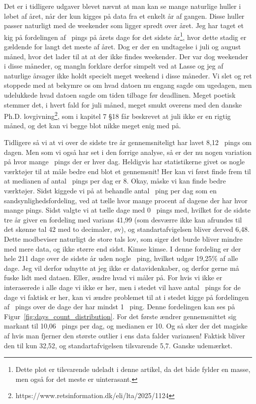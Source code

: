 \begin{article}
Det er i tidligere udgaver blevet nævnt at man kan se mange naturlige huller i løbet af året, når der kun kigges på data fra et enkelt år af gangen. Disse huller passer naturligt med de weekender som ligger spredt over året. 
Jeg har taget et kig på fordelingen af \coffee\ pings på årets dage for det sidste år\footnote{Dette plot er tilsvarende udeladt i denne artikel, da det både fylder en masse, men også for det meste er uinterasant.}, hvor dette stadig er gældende for langt det meste af året. Dog er der en undtagelse i juli og august måned, hvor det lader til at at der ikke findes weekender.
Der var dog weekender i disse måneder, og mangln forklare derfor simpelt ved at Lasse og jeg af naturlige årsager ikke holdt specielt meget weekend i disse måneder. Vi slet og ret stoppede med at bekymre os om hvad datoen nu engang sagde om ugedagen, men udelukkede hvad datoen sagde om tiden tilbage før deadlinen.
Meget poetisk stemmer det, i hvert fald for juli måned, meget smukt overens med den danske Ph.D. lovgivning\footnote{https://www.retsinformation.dk/eli/lta/2025/1124}, som i kapitel 7 \S 18 får beskrevet at juli ikke er en rigtig måned, og det kan vi begge blot nikke meget enig med på.

Tidligere så vi at vi over de sidste tre år gennemsniteligt har lavet 8,12 \coffee\ pings om dagen. Men som vi også har set i den forrige analyse, så er der nu nogen variation på hvor mange \coffee\ pings der er hver dag. Heldigvis har statistikerne givet os nogle værktøjer til at måle bedre end blot et gennemsnit! Her kan vi først finde frem til at medianen af antal \coffee\ pings per dag er 8. Okay, måske vi kan finde bedre værktøjer.
Sidst kiggede vi på at behandle antal \coffee\ ping per dag som en sandsynlighedsfordeling, ved at tælle hvor mange procent af dagene der har hvor mange pings. Sidst valgte vi at tælle dage med 0 \coffee\ pings med, hvilket for de sidste tre år giver en fordeling med varians 41,99 (som desværre ikke kan afrundes til det skønne tal 42 med to decimaler, øv), og standartafvigelsen bliver derved 6,48. Dette modbeviser naturligt de store tals lov, som siger det burde bliver mindre med mere data, og ikke større end sidst. Kimse kimse.
I denne fordeling er der hele 211 dage over de sidste år uden nogle \coffee\ ping, hvilket udgør 19,25\% af alle dage. Jeg vil derfor udnytte at jeg ikke er datavidenkaber, og derfor gerne må fuske lidt med dataen. Eller, ændre hvad vi måler på. For hvis vi ikke er interaserede i alle dage vi ikke er her, men i stedet vil have antal \coffee\ pings for de dage vi faktisk er her, kan vi ændre problemet til at i stedet kigge på fordelingen af \coffee\ pings over de dage der har mindst 1 \coffee\ ping. Denne fordelingen kan ses på Figur~\ref{fig:days_count_distribution}.
For det første ændrer gennemsnittet sig markant til 10,06 \coffee\ pings per dag, og medianen er 10. Og så sker der det magiske af hvis man fjerner den største outlier i ens data falder variansen! Faktisk bliver den til kun 32,52, og standartafvigelsen tilsvarende 5,7. Ganske udemærket.


\end{article}

